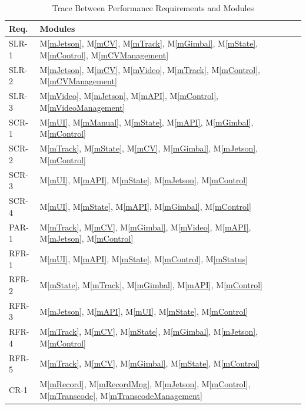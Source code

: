 \documentclass[12pt, titlepage]{article}
\newcommand{\mref}[1]{M\ref{#1}}
\begin{document}
\begin{table}[H]
  \centering
  \begin{tabular}{p{} p{}}
    \toprule
    \textbf{Req.} & \textbf{Modules}                                                                                                   \\
    \midrule
    SLR-1         & \mref{mJetson}, \mref{mCV}, \mref{mTrack}, \mref{mGimbal}, \mref{mState}, \mref{mControl}, \mref{mCVManagement}    \\
    SLR-2         & \mref{mJetson}, \mref{mCV}, \mref{mVideo}, \mref{mTrack}, \mref{mControl}, \mref{mCVManagement}                    \\
    SLR-3         & \mref{mVideo}, \mref{mJetson}, \mref{mAPI}, \mref{mControl}, \mref{mVideoManagement}                               \\
    SCR-1         & \mref{mUI}, \mref{mManual}, \mref{mState}, \mref{mAPI}, \mref{mGimbal}, \mref{mControl}                            \\
    SCR-2         & \mref{mTrack}, \mref{mState}, \mref{mCV}, \mref{mGimbal}, \mref{mJetson}, \mref{mControl}                          \\
    SCR-3         & \mref{mUI}, \mref{mAPI}, \mref{mState}, \mref{mJetson}, \mref{mControl}                                            \\
    SCR-4         & \mref{mUI}, \mref{mState}, \mref{mAPI}, \mref{mGimbal}, \mref{mControl}                                            \\
    PAR-1         & \mref{mTrack}, \mref{mCV}, \mref{mGimbal}, \mref{mVideo}, \mref{mAPI}, \mref{mJetson}, \mref{mControl}             \\
    RFR-1         & \mref{mUI}, \mref{mAPI}, \mref{mState}, \mref{mControl}, \mref{mStatus}                                            \\
    RFR-2         & \mref{mState}, \mref{mTrack}, \mref{mGimbal}, \mref{mAPI}, \mref{mControl}                                         \\
    RFR-3         & \mref{mJetson}, \mref{mAPI}, \mref{mUI}, \mref{mState}, \mref{mControl}                                            \\
    RFR-4         & \mref{mTrack}, \mref{mCV}, \mref{mState}, \mref{mGimbal}, \mref{mJetson}, \mref{mControl}                          \\
    RFR-5         & \mref{mTrack}, \mref{mCV}, \mref{mGimbal}, \mref{mState}, \mref{mControl}                                          \\
    CR-1          & \mref{mRecord}, \mref{mRecordMng}, \mref{mJetson}, \mref{mControl}, \mref{mTranscode}, \mref{mTranscodeManagement} \\
    \bottomrule
  \end{tabular}
  \caption{Trace Between Performance Requirements and Modules}
  \label{TblPerformanceModules}
\end{table}
\end{document}
